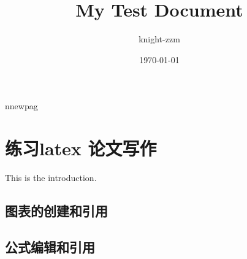 \documentclass[a4paper,12pt]{article}
\begin{document}
\title{My Test Document}
\author{knight-zzm}
\date{\today}
\maketitle
\newpage
\tableofcontents
nnewpag
\section{练习latex 论文写作}
This is the introduction.

\subsection{图表的创建和引用}
\subsection{公式编辑和引用}
\end{document}
